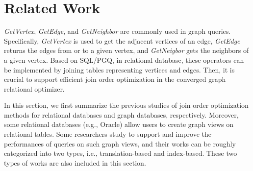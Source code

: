 \section{Related Work}
\label{sec:related-work}
\textit{GetVertex}, \textit{GetEdge}, and \textit{GetNeighbor} are commonly used in graph queries.
Specifically, \textit{GetVertex} is used to get the adjacent vertices of an edge, \textit{GetEdge} returns the edges from or to a given vertex, and \textit{GetNeigbor} gets the neighbors of a given vertex.
Based on SQL/PGQ, in relational database, these operators can be implemented by joining tables representing vertices and edges.
Then, it is crucial to support efficient join order optimization in the converged graph relational optimizer.
 
In this section, we first summarize the previous studies of join order optimization methods for relational databases and graph databases, respectively.
Moreover, some relational databases (e.g., Oracle) allow users to create graph views on relational tables.
Some researchers study to support and improve the performances of queries on such graph views, and their works can be roughly categorized into two types, i.e., translation-based and index-based.
These two types of works are also included in this section.

